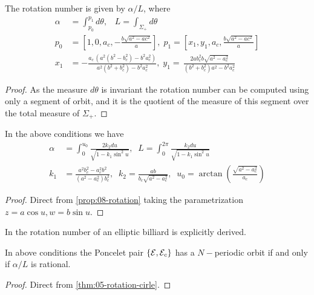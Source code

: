  \begin{proposition}
 The rotation number is given by
 $\alpha/L$, where
\begin{align*}
  \alpha &= \int_{p_0}^{p_{1}}d\theta, \;\;\; L=\int_{\Sigma_+} d\theta    \\ p_0&=\left[1,0,a_c,-\frac{b\sqrt{a^2 - ac^2}}{a}\right], \;p_1=\left[x_1,y_1, a_c,\frac{b\sqrt{a^2 - ac^2}}{a}\right]\\
    x_1&=-\frac {a_c\, \left( {a}^{2}({b}^{2}- b_c^{2})-{b}^{2}a_c^{2} \right) }{a^{2}(b^{2}+ b_c^{2})-b^{2}
a_c^2}, \; y_1= \,\frac {2 a b_c^{2}b\sqrt {{a}^{2}-a_c^{2}}}{ \left( {b}^{2}+b_c^{2} \right) {a}^{2}-{b}^{2}a_c^2}
    \end{align*}
\label{prop:08-rotation}
 \end{proposition}
 \begin{proof}
 As the measure $d\theta$ is invariant the rotation number can be computed using only a segment of orbit, and it is the quotient of the measure of this segment over the total measure of $\Sigma_+$.
 \end{proof}
 
 \begin{corollary}
 In the above conditions we have
 \begin{align*}
     \alpha &=\int_{0}^{u_0}\frac{2k_2du}{\sqrt{1-k_1\sin^2 u}},\;\; L=\int_{0}^{2\pi}\frac{k_2du}{\sqrt{1-k_1\sin^2 u}}\\
     k_1&=\frac{a^2 b_c^2 - a_c^2 b^2 }{(a^2  - a_c^2) b_c^2},\;\; k_2=\frac{ab}{b_c\sqrt{a^2   - a_c^2}  },\;\;
     u_0=\arctan{\left(\frac{\sqrt{a^2-a_c^2}}{a_c}\right)}
 \end{align*}
 \end{corollary}
 
 \begin{proof}
 Direct from \cref{prop:08-rotation} taking the parametrization $z=a\cos u, w=b\sin u$.
 \end{proof}

\begin{remark}
In  \cite{kolod1985} the rotation number of an elliptic billiard  is explicitly derived. %
\end{remark}

 
\begin{corollary} 
In   above conditions  the Poncelet pair $\{\mathcal{E},\mathcal{E}_c\}$ has a $N-$periodic orbit if and only if $\alpha/L$ is rational.
\end{corollary}

 
\begin{proof} Direct from \cref{thm:05-rotation-cirle}.
\end{proof}

